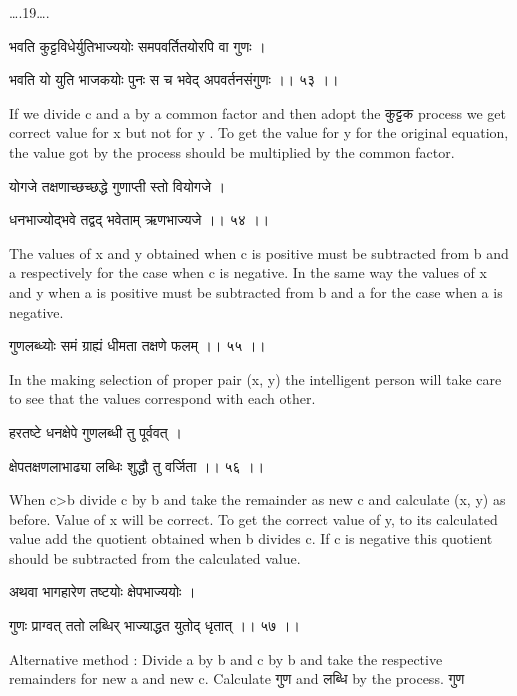 \documentclass[]{article}
\date{}
\begin{document}
{\ldots{}.19\ldots{}. }

{भवति कुट्टविधेर्युतिभाज्ययोः समपवर्तितयोरपि वा गुणः । }

{भवति यो युति भाजकयोः पुनः स च भवेद् अपवर्तनसंगुणः ।। ५३ ।। }

{If we divide c and a by a common factor and then adopt the कुट्टक
process we get correct value for x but not for y . To get the value for
y for the original equation, the value got by the process should be
multiplied by the common factor.}

{योगजे तक्षणाच्छच्छद्धे गुणाप्ती स्तो वियोगजे । }

{धनभाज्योद्भवे तद्वद् भवेताम् ऋणभाज्यजे ।। ५४ ।। }

{The values of x and y obtained when c is positive must be subtracted
from b and a respectively for the case when c is negative. In the same
way the values of x and y when a is positive must be subtracted from b
and a for the case when a is negative. }

{गुणलब्ध्योः समं ग्राह्यं धीमता तक्षणे फलम् ।। ५५ ।। }

{In the making selection of proper pair (x, y) the intelligent person
will take care to see that the values correspond with each other.}

{हरतष्टे धनक्षेपे गुणलब्धी तु पूर्ववत् । }

{क्षेपतक्षणलाभाढ्या लब्धिः शुद्धौ तु वर्जिता ।। ५६ ।। }

{When c\textgreater{}b divide c by b and take the remainder as new c and
calculate (x, y) as before. Value of x will be correct. To get the
correct value of y, to its calculated value add the quotient obtained
when b divides c. If c is negative this quotient should be subtracted
from the calculated value.}

{अथवा भागहारेण तष्टयोः क्षेपभाज्ययोः । }

{गुणः प्राग्वत् ततो लब्धिर् भाज्याद्धत युतोद् धृतात् ।। ५७ ।। }

{Alternative method : Divide a by b and c by b and take the respective
remainders for new a and new c. Calculate गुण and लब्धि by the process.
गुण}
\end{document}
